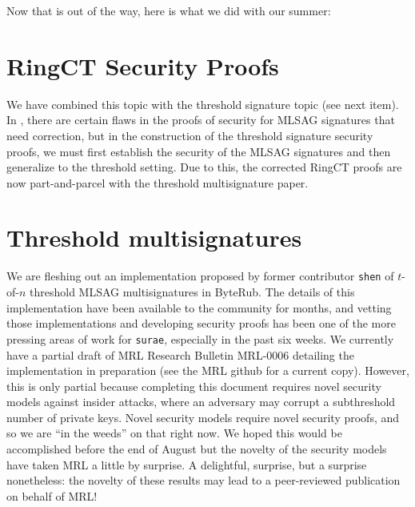 \documentclass[12pt,english]{mrl}
\theoremstyle{definition}
\numberwithin{equation}{section}
\numberwithin{figure}{section}
\numberwithin{equation}{section}
\numberwithin{equation}{section}
\numberwithin{figure}{section}
\begin{document}
Now that is out of the way, here is what we did with our summer:


\section{RingCT Security Proofs} 

We have combined this topic with the threshold signature topic (see next item). In \cite{noether2016ring}, there are certain flaws in the proofs of security for MLSAG signatures that need correction, but in the construction of the threshold signature security proofs, we must first establish the security of the MLSAG signatures and then generalize to the threshold setting. Due to this, the corrected RingCT proofs are now part-and-parcel with the threshold multisignature paper.
    
    
\section{Threshold multisignatures} 

We are fleshing out an implementation proposed by former contributor \texttt{shen} of $t$-of-$n$ threshold MLSAG multisignatures in ByteRub. The details of this implementation have been available to the community for months, and vetting those implementations and developing security proofs has been one of the more pressing areas of work for \texttt{surae}, especially in the past six weeks. We currently have a partial draft of MRL Research Bulletin MRL-0006 detailing the implementation in preparation (see the MRL github for a current copy). However, this is only partial because completing this document requires novel security models against insider attacks, where an adversary may corrupt a subthreshold number of private keys. Novel security models require novel security proofs, and so we are ``in the weeds'' on that right now. We hoped this would be accomplished before the end of August but the novelty of the security models have taken MRL a little by surprise. A delightful, surprise, but a surprise nonetheless: the novelty of these results may lead to a peer-reviewed publication on behalf of MRL!
    
\end{document}
